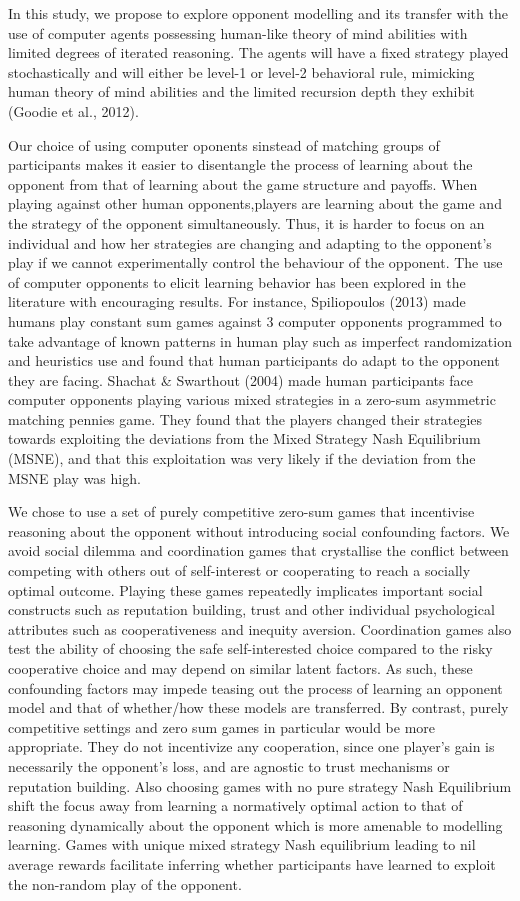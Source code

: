 \documentclass[man,floatsintext]{apa6}
\begin{document}
In this study, we propose to explore opponent modelling and its transfer with the use of computer agents possessing human-like theory of mind abilities with limited degrees of iterated reasoning. The agents will have a fixed strategy played stochastically and will either be level-1 or level-2 behavioral rule, mimicking human theory of mind abilities and the limited recursion depth they exhibit (Goodie et al., 2012).

Our choice of using computer oponents sinstead of matching groups of participants makes it easier to disentangle the process of learning about the opponent from that of learning about the game structure and payoffs. When playing against other human opponents,players are learning about the game and the strategy of the opponent simultaneously. Thus, it is harder to focus on an individual and how her strategies are changing and adapting to the opponent's play if we cannot experimentally control the behaviour of the opponent. The use of computer opponents to elicit learning behavior has been explored in the literature with encouraging results. For instance, Spiliopoulos (2013) made humans play constant sum games against 3 computer opponents programmed to take advantage of known patterns in human play such as imperfect randomization and heuristics use and found that human participants do adapt to the opponent they are facing. Shachat \& Swarthout (2004) made human participants face computer opponents playing various mixed strategies in a zero-sum asymmetric matching pennies game. They found that the players changed their strategies towards exploiting the deviations from the Mixed Strategy Nash Equilibrium (MSNE), and that this exploitation was very likely if the deviation from the MSNE play was high.

We chose to use a set of purely competitive zero-sum games that incentivise reasoning about the opponent without introducing social confounding factors. We avoid social dilemma and coordination games that crystallise the conflict between competing with others out of self-interest or cooperating to reach a socially optimal outcome. Playing these games repeatedly implicates important social constructs such as reputation building, trust and other individual psychological attributes such as cooperativeness and inequity aversion. Coordination games also test the ability of choosing the safe self-interested choice compared to the risky cooperative choice and may depend on similar latent factors. As such, these confounding factors may impede teasing out the process of learning an opponent model and that of whether/how these models are transferred. By contrast, purely competitive settings and zero sum games in particular would be more appropriate. They do not incentivize any cooperation, since one player's gain is necessarily the opponent's loss, and are agnostic to trust mechanisms or reputation building. Also choosing games with no pure strategy Nash Equilibrium shift the focus away from learning a normatively optimal action to that of reasoning dynamically about the opponent which is more amenable to modelling learning. Games with unique mixed strategy Nash equilibrium leading to nil average rewards facilitate inferring whether participants have learned to exploit the non-random play of the opponent.
\end{document}

